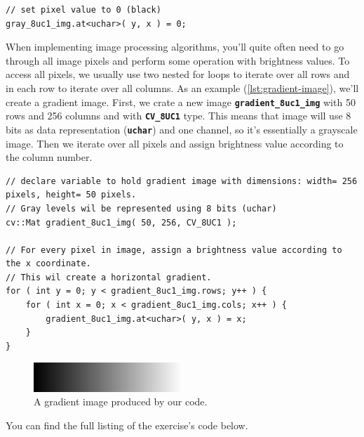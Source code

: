 \documentclass[10pt]{article}
\newcommand{\code}[1]{\textbf{\texttt{#1}}}
\newcommand{\tuchar}[0]{\code{uchar}}
\begin{document}
\begin{lstlisting}[style=CStyle,caption={Asigning a new value to a pixel.},label={lst:pixel-assign}]
// set pixel value to 0 (black)
gray_8uc1_img.at<uchar>( y, x ) = 0;
\end{lstlisting}

When implementing image processing algorithms, you'll quite often need to go through all image pixels
and perform some operation with brightness values. To access all pixels, we usually use two nested for loops
to iterate over all rows and in each row to iterate over all columns. As an example (\ref{lst:gradient-image}),
we'll create a gradient image.
First, we crate a new image \code{gradient\_8uc1\_img} with 50 rows and 256 columns and with \code{CV\_8UC1} type.
This means that image will use 8 bits as data representation (\tuchar{}) and one channel, so it's essentially
a grayscale image. Then we iterate over all pixels and assign brightness value according to the column number.

\begin{lstlisting}[style=CStyle,caption={Create an image of a horizontal gradient from black color to white using grayscale.},label={lst:gradient-image}]
// declare variable to hold gradient image with dimensions: width= 256 pixels, height= 50 pixels.
// Gray levels wil be represented using 8 bits (uchar)
cv::Mat gradient_8uc1_img( 50, 256, CV_8UC1 );

// For every pixel in image, assign a brightness value according to the x coordinate.
// This wil create a horizontal gradient.
for ( int y = 0; y < gradient_8uc1_img.rows; y++ ) {
    for ( int x = 0; x < gradient_8uc1_img.cols; x++ ) {
        gradient_8uc1_img.at<uchar>( y, x ) = x;
    }
}
\end{lstlisting}

\begin{figure}[th]
\begin{center}
    \includegraphics[width=0.5\textwidth]{gradient_8uc1_img}
    \caption{A gradient image produced by our code.}
    \label{img:gradient_example}
\end{center}
\end{figure}

You can find the full listing of the exercise's code below.
\end{document}
